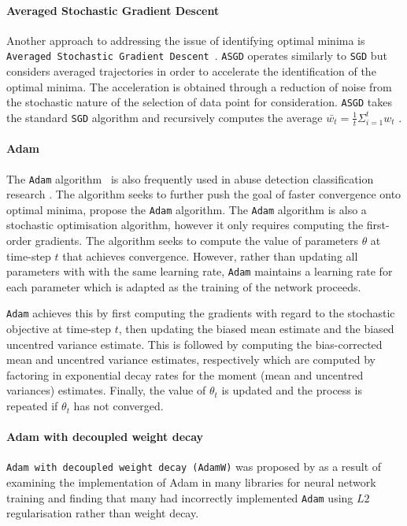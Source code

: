 \paragraph{Averaged Stochastic Gradient Descent}
Another approach to addressing the issue of identifying optimal minima is \texttt{Averaged Stochastic Gradient Descent}~\citet{Polyak:1992}. \texttt{ASGD} operates similarly to \texttt{SGD} but considers averaged trajectories in order to accelerate the identification of the optimal minima. The acceleration is obtained through a reduction of noise from the stochastic nature of the selection of data point for consideration. \texttt{ASGD} takes the standard \texttt{SGD} algorithm and recursively computes the average $\bar{w_t} = \tfrac{1}{t}\Sigma_{i=1}^t w_t$ \citep{Bottou:2010}.

\paragraph{Adam}
The \texttt{Adam} algorithm~\citep{Kingma:2015} is also frequently used in abuse detection classification research \citep{Meyer:2019,Zimmerman:2018,Kolhatkar:2021}.
The algorithm seeks to further push the goal of faster convergence onto optimal minima, \citet{Kingma:2015} propose the \texttt{Adam} algorithm.
The \texttt{Adam} algorithm is also a stochastic optimisation algorithm, however it only requires computing the first-order gradients.
The algorithm seeks to compute the value of parameters $\theta$ at time-step $t$ that achieves convergence.
However, rather than updating all parameters with with the same learning rate, \texttt{Adam} maintains a learning rate for each parameter which is adapted as the training of the network proceeds.

\texttt{Adam} achieves this by first computing the gradients with regard to the stochastic objective at time-step $t$, then updating the biased mean estimate and the biased uncentred variance estimate.
This is followed by computing the bias-corrected mean and uncentred variance estimates, respectively which are computed by factoring in exponential decay rates for the moment (mean and uncentred variances) estimates.
Finally, the value of $\theta_t$ is updated and the process is repeated if $\theta_t$ has not converged.

\paragraph{Adam with decoupled weight decay} \texttt{Adam with decoupled weight decay (AdamW)} was proposed by \citet{Loshchilov:2019} as a result of examining the implementation of Adam in many libraries for neural network training and finding that many had incorrectly implemented \texttt{Adam} using $L2$ regularisation rather than weight decay.

